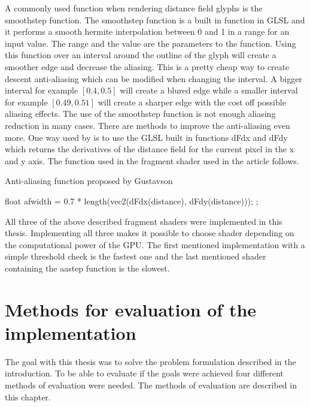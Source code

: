 A commonly used function when rendering distance field glyphs is the smoothstep function. The smoothstep function is a built in function in GLSL and it performs a smooth hermite interpolation between 0 and 1 in a range for an input value. The range and the value are the parameters to the function. Using this function over an interval around the outline of the glyph will create a smoother edge and decrease the aliasing. This is a pretty cheap way to create descent anti-aliasing which can be modified when changing the interval. A bigger interval for example $[0.4,0.5]$ will create a blured edge while a smaller interval for example $[0.49,0.51]$ will create a sharper edge with the cost off possible aliasing effects. The use of the smoothstep function is not enough aliasing reduction in many cases. There are methods to improve the anti-aliasing even more. One way used by \citet{gustavson20122d} is to use the GLSL built in functions dFdx and dFdy which returns the derivatives of the distance field for the current pixel in the x and y axis. The function used in the fragment shader used in the article follows.
\begin{algorithm}[H]
\caption{Anti-aliasing function proposed by Gustavson}
\begin{algorithmic}
\State float afwidth = 0.7 * length(vec2(dFdx(distance), dFdy(distance)));
\State \Return {};
\EndProcedure
\end{algorithmic}
\end{algorithm}
All three of the above described fragment shaders were implemented in this thesis. Implementing all three makes it possible to choose shader depending on the computational power of the GPU. The first mentioned implementation with a simple threshold check is the fastest one and the last mentioned shader containing the aastep function is the slowest.
\chapter{Methods for evaluation of the implementation}
The goal with this thesis was to solve the problem formulation described in the introduction. To be able to evaluate if the goals were achieved four different methods of evaluation were needed. The methods of evaluation are described in this chapter.
